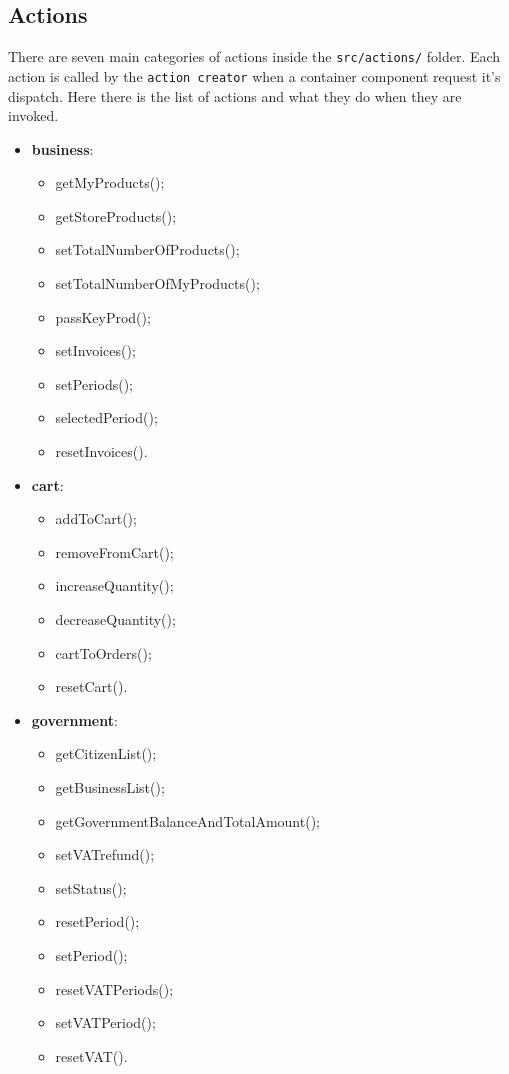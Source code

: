 \subsection{Actions}
There are seven main categories of actions inside the \texttt{src/actions/} folder. Each action is called by the \texttt{action creator} when a container component request it's dispatch. Here there is the list of actions and what they do when they are invoked.
\begin{itemize}
	\item \textbf{business}: \begin{itemize}
		\item getMyProducts();
		\item getStoreProducts();
		\item setTotalNumberOfProducts();
		\item setTotalNumberOfMyProducts();
		\item passKeyProd();
		\item setInvoices();
		\item setPeriods();
		\item selectedPeriod();
		\item resetInvoices().
	\end{itemize}
	\item \textbf{cart}:
	\begin{itemize}
		\item addToCart();
		\item removeFromCart();
		\item increaseQuantity();
		\item decreaseQuantity();
		\item cartToOrders();
		\item resetCart().
	\end{itemize}
	\item \textbf{government}:
	\begin{itemize}
		\item getCitizenList();
		\item getBusinessList();
		\item getGovernmentBalanceAndTotalAmount();
		\item setVATrefund();
		\item setStatus();
		\item resetPeriod();
		\item setPeriod();
		\item resetVATPeriods();
		\item setVATPeriod();
		\item resetVAT().

\end{itemize}
\end{itemize}
